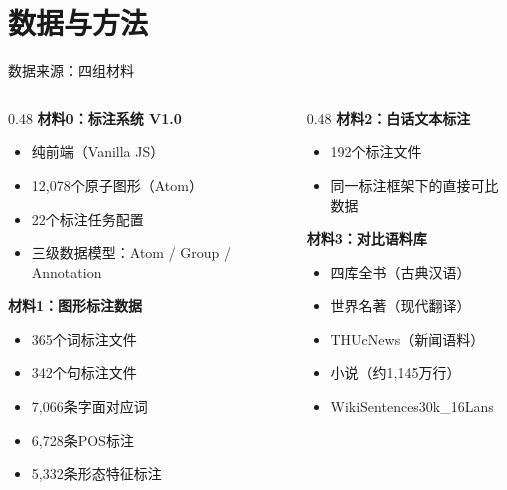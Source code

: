\documentclass[aspectratio=169,xcolor=x11names,compress]{ctexbeamer}
\begin{document}
\section{数据与方法}

\begin{frame}{数据来源：四组材料}
\begin{columns}
\begin{column}{0.48\textwidth}
\textbf{材料0：标注系统 V1.0}
\begin{itemize}
    \item 纯前端（Vanilla JS）
    \item 12,078个原子图形（Atom）
    \item 22个标注任务配置
    \item 三级数据模型：Atom / Group / Annotation
\end{itemize}

\vspace{0.3em}
\textbf{材料1：图形标注数据}
\begin{itemize}
    \item 365个词标注文件
    \item 342个句标注文件
    \item 7,066条字面对应词
    \item 6,728条POS标注
    \item 5,332条形态特征标注
\end{itemize}
\end{column}
\begin{column}{0.48\textwidth}
\textbf{材料2：白话文本标注}
\begin{itemize}
    \item 192个标注文件
    \item 同一标注框架下的直接可比数据
\end{itemize}

\vspace{0.3em}
\textbf{材料3：对比语料库}
\begin{itemize}
    \item 四库全书（古典汉语）
    \item 世界名著（现代翻译）
    \item THUcNews（新闻语料）
    \item 小说（约1,145万行）
    \item WikiSentences30k\_16Lans
\end{itemize}
\end{column}
\end{columns}
\end{frame}
\end{document}
